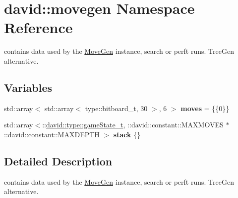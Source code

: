 \hypertarget{namespacedavid_1_1movegen}{}\section{david\+:\+:movegen Namespace Reference}
\label{namespacedavid_1_1movegen}


contains data used by the \hyperlink{classdavid_1_1MoveGen}{Move\+Gen} instance, search or perft runs. Tree\+Gen alternative.  


\subsection*{Variables}
\begin{DoxyCompactItemize}
\item 
\mbox{\label{namespacedavid_1_1movegen_a2e16f3fe09247df16d8811fe1d38cab3}} 
std\+::array$<$ std\+::array$<$ type\+::bitboard\+\_\+t, 30 $>$, 6 $>$ {\bfseries moves} = \{\{0\}\}
\item 
\mbox{\label{namespacedavid_1_1movegen_ad43fb8cbc0d60e7589c211e10e4c68ea}} 
std\+::array$<$\+::\hyperlink{structdavid_1_1bitboard_1_1gameState}{david\+::type\+::game\+State\+\_\+t}, \+::david\+::constant\+::\+M\+A\+X\+M\+O\+V\+ES $\ast$\+::david\+::constant\+::\+M\+A\+X\+D\+E\+P\+TH $>$ {\bfseries stack} \{\}
\end{DoxyCompactItemize}


\subsection{Detailed Description}
contains data used by the \hyperlink{classdavid_1_1MoveGen}{Move\+Gen} instance, search or perft runs. Tree\+Gen alternative. 